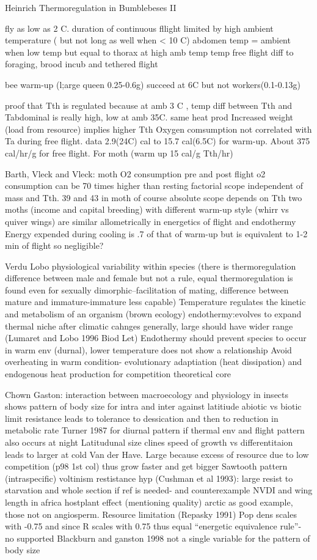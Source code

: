  Heinrich Thermoregulation in Bumblebeses II
 
fly as low as 2 C. 
duration of continuous fllight limited by high ambient temperature ( but not long as well when < 10 C)
abdomen temp = ambient when low temp but equal to thorax at high amb temp
temp free flight diff to foraging, brood incub and tethered flight

bee warm-up (l;arge queen 0.25-0.6g) succeed at 6C but not workers(0.1-0.13g)

proof that Tth is regulated because at amb 3 C , temp diff between Tth and Tabdominal is really high, low at amb 35C. same heat prod
Increased weight (load from resource) implies higher Tth
Oxygen comsumption not correlated with Ta during free flight.
 data 2.9(24C)  cal to 15.7 cal(6.5C) for warm-up. About 375 cal/hr/g for free flight. For moth (warm up 15 cal/g Tth/hr)
 
 Barth, Vleck and Vleck: moth O2 consumption pre and post flight 
 o2 consumption can be 70 times higher than resting
 factorial scope independent of mass and Tth. 39 and 43 in moth
 of course absolute scope depends on Tth
 two moths (income and capital breeding)  with different warm-up style (whirr vs quiver wings) are similar allometrically in energetics of flight and endothermy
 Energy expended during cooling is  .7 of that of warm-up but is equivalent to 1-2 min of flight so negligible?   
 

Verdu Lobo
physiological variability within species (there is  thermoregulation difference between male and female but not a rule, equal thermoregulation is found even for sexually dimorphic--facilitation of mating, difference between mature and immature-immature less capable)
Temperature regulates the kinetic and metabolism of an organism (brown ecology)
endothermy:evolves to expand thermal niche after climatic cahnges
generally, large should have wider range   (Lumaret and Lobo 1996 Biod Let)
Endothermy should prevent species to occur in warm env (durnal), lower temperature does not show a relationship
Avoid overheating in warm condition- evolutionary adaptiation (heat dissipation) and endogenous heat production for competition
theoretical core
 
 
 Chown Gaston: 
 interaction between macroecology and physiology in insects
 shows pattern of body size for intra and inter against latitiude
 abiotic vs biotic limit
 resistance leads to tolerance to dessication and then to reduction in metabolic rate 
 Turner 1987 for diurnal pattern if thermal env and flight pattern also occurs at night
 Latitudunal size clines
 speed of growth vs differentitaion leads to larger at cold Van der Have.
 Large because excess of resource due to low competition (p98 1st col) thus grow faster and get bigger
 Sawtooth pattern (intraspecific) voltinism
 restistance hyp (Cushman et al 1993): large resist to starvation and whole section if ref is needed- and counterexample NVDI and wing length in africa
 hostplant effect (mentioning quality) arctic as good example, those not on angiosperm. Resource limitation (Repasky 1991)
 Pop dens scales with -0.75  and since R scales  with 0.75 thus equal ``energetic equivalence rule''- no supported Blackburn and ganston 1998
 not a single variable for the pattern of body size
 
